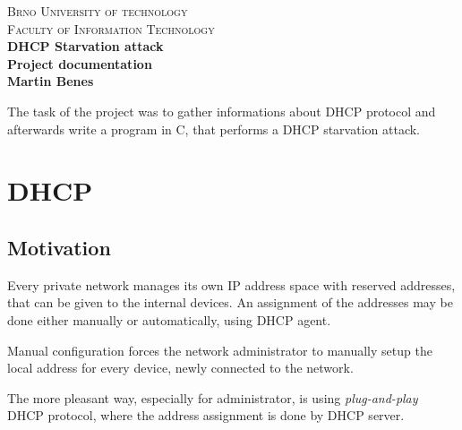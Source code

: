 \documentclass[10pt,a4paper,titlepage]{article}
\begin{document}
\begin{titlepage}

\begin{center}
\textsc{\LARGE Brno University of technology}\\[0.5cm]
\textsc{\large Faculty of Information Technology}\\[8cm]

{ \huge \bfseries DHCP Starvation attack}\\[0.3cm]
{ \Large \bfseries Project documentation}\\[0.5cm]
{ \bfseries Martin Benes}\\

\end{center}

\end{titlepage}
\newpage



The task of the project was to gather informations about DHCP protocol and
afterwards write a program in C, that performs a DHCP starvation attack.



\section*{DHCP}


\subsection*{Motivation}
Every private network manages its own IP address space with reserved addresses, that
can be given to the internal devices. An assignment of the addresses may be
done either manually or automatically, using DHCP agent.

Manual configuration forces the network administrator to manually setup the
local address for every device, newly connected to the network.

The more pleasant way, especially for administrator, is using {\it plug-and-play}
DHCP protocol, where the address assignment is done by DHCP server.
\cite{computernetworking} \cite{pocitacovesite}
\end{document}

